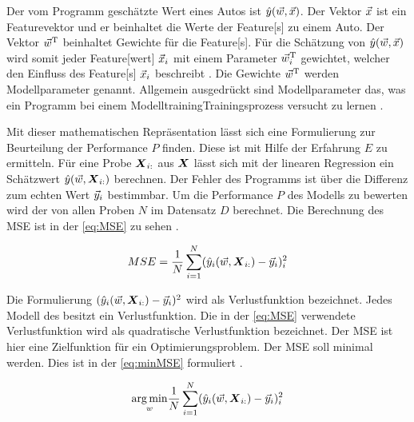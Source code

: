 Der vom Programm geschätzte Wert eines Autos ist \(\hat{y}(\vec{w}, \vec{x})\). Der Vektor \(\vec{x}\) ist ein \gls{Featurevektor} und er beinhaltet die Werte der \gls{Feature}[s] zu einem Auto. Der Vektor \(\vec{w}^\mathrm{T}\) beinhaltet Gewichte für die \gls{Feature}[s]. Für die Schätzung von \(\hat{y}(\vec{w}, \vec{x})\) wird somit jeder \gls{Feature}[wert] \(\vec{x}_i\) mit einem Parameter \(\vec{w}^\mathrm{T}_i\) gewichtet, welcher den Einfluss des \gls{Feature}[s] \(\vec{x}_i\) beschreibt \cite{Goodfellow.2016}. Die Gewichte \(\vec{w}^\mathrm{T}\) werden \gls{Modellparameter} genannt. Allgemein ausgedrückt sind \gls{Modellparameter} das, was ein Programm bei einem \gls{Modelltraining}{Trainingsprozess} versucht zu lernen \cite{Zheng.2015}. \par

Mit dieser mathematischen Repräsentation lässt sich eine Formulierung zur Beurteilung der Performance \(P\) finden. Diese ist mit Hilfe der Erfahrung \(E\) zu ermitteln. Für eine Probe \(\boldsymbol{X}_{i:}\) aus \(\boldsymbol{X}\) lässt sich mit der linearen Regression ein Schätzwert \(\hat{y}(\vec{w}, \boldsymbol{X}_{i:})\) berechnen. Der Fehler des Programms ist über die Differenz zum echten Wert \(\vec{y}_i\) bestimmbar. Um die Performance \(P\) des Modells zu bewerten wird der   von allen Proben \(N\) im Datensatz \(D\) berechnet. Die Berechnung des \gls{MSE} ist in der \autoref{eq:MSE} zu sehen \cite{Goodfellow.2016, Burkov.2019}.

\begin{equation}
    \label{eq:MSE}
    MSE = \frac{1}{N} \sum_{i=1}^{N} (\hat{y}_i(\vec{w}, \boldsymbol{X}_{i:}) - \vec{y}_i)_i^2
\end{equation}

Die Formulierung \((\hat{y}_i(\vec{w}, \boldsymbol{X}_{i:}) - \vec{y}_i)^2\) wird als \gls{Verlustfunktion} bezeichnet. Jedes Modell des  besitzt ein \gls{Verlustfunktion}. Die in der \autoref{eq:MSE} verwendete \gls{Verlustfunktion} wird als quadratische \gls{Verlustfunktion} bezeichnet. Der \gls{MSE} ist hier eine \gls{Zielfunktion} für ein Optimierungsproblem. Der \gls{MSE} soll minimal werden. Dies ist in der \autoref{eq:minMSE} formuliert \cite{Goodfellow.2016, Burkov.2019}.

\begin{equation}
    \label{eq:minMSE}
    \underset{w}{\arg\min} \frac{1}{N} \sum_{i=1}^{N} (\hat{y}_i(\vec{w}, \boldsymbol{X}_{i:}) - \vec{y}_i)_i^2
\end{equation}


